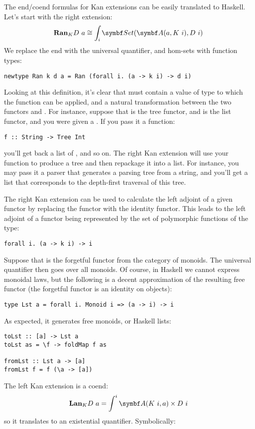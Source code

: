 The end/coend formulas for Kan extensions can be easily translated to
Haskell. Let's start with the right extension:
\[\Ran_{K}D\ a \cong \int_i \Set(\cat{A}(a, K\ i), D\ i)\]
We replace the end with the universal quantifier, and hom-sets with
function types:

\begin{Verbatim}
newtype Ran k d a = Ran (forall i. (a -> k i) -> d i)
\end{Verbatim}
Looking at this definition, it's clear that  must contain a
value of type  to which the function can be applied, and a
natural transformation between the two functors  and
. For instance, suppose that  is the tree functor,
and  is the list functor, and you were given a
. If you pass it a function:

\begin{Verbatim}
f :: String -> Tree Int
\end{Verbatim}
you'll get back a list of , and so on. The right Kan
extension will use your function to produce a tree and then repackage it
into a list. For instance, you may pass it a parser that generates a
parsing tree from a string, and you'll get a list that corresponds to
the depth-first traversal of this tree.

The right Kan extension can be used to calculate the left adjoint of a
given functor by replacing the functor  with the identity
functor. This leads to the left adjoint of a functor  being
represented by the set of polymorphic functions of the type:

\begin{Verbatim}
forall i. (a -> k i) -> i
\end{Verbatim}
Suppose that  is the forgetful functor from the category of
monoids. The universal quantifier then goes over all monoids. Of course,
in Haskell we cannot express monoidal laws, but the following is a
decent approximation of the resulting free functor (the forgetful
functor  is an identity on objects):

\begin{Verbatim}
type Lst a = forall i. Monoid i => (a -> i) -> i
\end{Verbatim}
As expected, it generates free monoids, or Haskell lists:

\begin{Verbatim}
toLst :: [a] -> Lst a
toLst as = \f -> foldMap f as

fromLst :: Lst a -> [a]
fromLst f = f (\a -> [a])
\end{Verbatim}
The left Kan extension is a coend:
\[\Lan_{K}D\ a = \int^i \cat{A}(K\ i, a)\times{}D\ i\]
so it translates to an existential quantifier. Symbolically:

